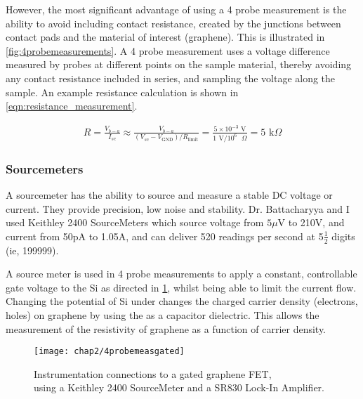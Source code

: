 \documentclass[../../Matt_Gebert_Honours_Thesis.tex]{subfiles}
\begin{document}
	However, the most significant advantage of using a 4 probe measurement is the ability to avoid including contact resistance, created by the junctions between contact pads and the material of interest (graphene). This is illustrated in \cref{fig:4probemeasurements}.
	A 4 probe measurement uses a voltage difference measured by probes at different points on the sample material, thereby avoiding any contact resistance included in series, and sampling the voltage along the sample. An example resistance calculation is shown in \cref{eqn:resistance_measurement}.
	
	\begin{align}
	R = \frac{V_{b-a}}{I_{sc}} \approx \frac{V_{b-a}}{\left(V_{sc}-V_{\text{GND}}\right)/R_{\text{limit}}}  =\frac{5\times 10^{-3}\text{ V}}{1 \text{ V}/10^6 \text{ }\Omega} = 5 \text{ k}\Omega
	\label{eqn:resistance_measurement}
	\end{align}
	
	\subsubsection{Sourcemeters}
	
	A sourcemeter has the ability to source and measure a stable DC voltage or current. They provide precision, low noise and stability. Dr. Battacharyya and I used Keithley 2400 SourceMeters \cite{keithley2400} which source voltage from $5\mu$V to 210V, and current from 50pA to 1.05A, and can deliver 520 readings per second at 5$\frac{1}{2}$ digits (ie, 199999). 
	
	A source meter is used in 4 probe measurements to apply a constant, controllable gate voltage to the Si as directed in \cref{fig:instrumentation_device}, whilst being able to limit the current flow. Changing the potential of Si under \silicondioxide{} changes the charged carrier density (electrons, holes) on graphene by using the \silicondioxide{} as a capacitor dielectric. This allows the measurement of the resistivity of graphene as a function of carrier density.
	
	\begin{figure}[H]
		\centering
		\texttt{[image: chap2/4probemeasgated]}
		\caption[Instrumentation connections to a gated graphene FET]{Instrumentation connections to a gated graphene FET,\\ using a Keithley 2400 SourceMeter and a SR830 Lock-In Amplifier.} \label{fig:instrumentation_device}
	\end{figure}
	
\end{document}
